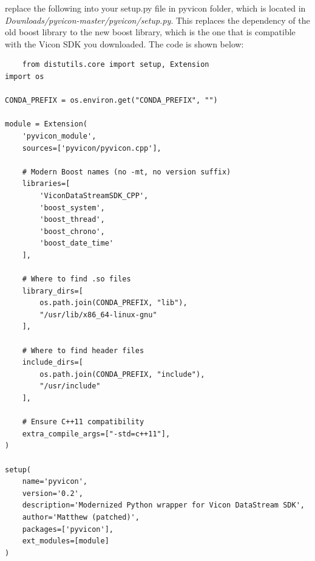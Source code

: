 \documentclass[12pt]{article}
\numberwithin{equation}{section}
\begin{document}
replace the following into your setup.py file in pyvicon folder, which is located in \textit{Downloads/pyvicon-master/pyvicon/setup.py}. This replaces the dependency of the old boost library to the new boost library, which is the one that is compatible with the Vicon SDK you downloaded. The code is shown below:

\begin{lstlisting}
    from distutils.core import setup, Extension
import os

CONDA_PREFIX = os.environ.get("CONDA_PREFIX", "")

module = Extension(
    'pyvicon_module',
    sources=['pyvicon/pyvicon.cpp'],

    # Modern Boost names (no -mt, no version suffix)
    libraries=[
        'ViconDataStreamSDK_CPP',
        'boost_system',
        'boost_thread',
        'boost_chrono',
        'boost_date_time'
    ],

    # Where to find .so files
    library_dirs=[
        os.path.join(CONDA_PREFIX, "lib"),
        "/usr/lib/x86_64-linux-gnu"
    ],

    # Where to find header files
    include_dirs=[
        os.path.join(CONDA_PREFIX, "include"),
        "/usr/include"
    ],

    # Ensure C++11 compatibility
    extra_compile_args=["-std=c++11"],
)

setup(
    name='pyvicon',
    version='0.2',
    description='Modernized Python wrapper for Vicon DataStream SDK',
    author='Matthew (patched)',
    packages=['pyvicon'],
    ext_modules=[module]
)

\end{lstlisting}

\clearpage


\end{document}
